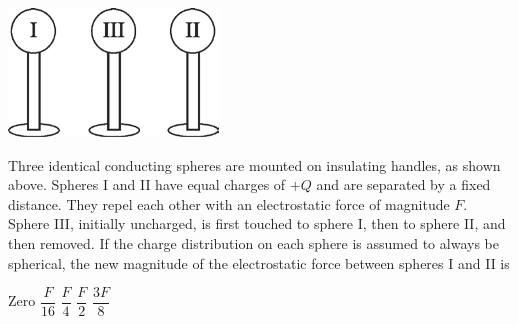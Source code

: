 \begin{center}
\includegraphics[scale=0.5]{images/img-004-014.png}
\end{center}

\begin{questions}\setcounter{question}{13}\question
Three identical conducting spheres are mounted on insulating handles, as shown above. Spheres I and II have equal charges of $+Q$ and are separated by a fixed distance. They repel each other with an electrostatic force of magnitude $F$. Sphere III, initially uncharged, is first touched to sphere I, then to sphere II, and then removed. If the charge distribution on each sphere is assumed to always be spherical, the new magnitude of the electrostatic force between spheres I and II is

\begin{oneparchoices}
\choice Zero
\choice $\dfrac{F}{16}$
\choice $\dfrac{F}{4}$
\choice $\dfrac{F}{2}$
\choice $\dfrac{3 F}{8}$
\end{oneparchoices}\end{questions}

